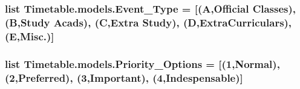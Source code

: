 \subsubsection[{\texorpdfstring{Event\+\_\+\+Type}{Event_Type}}]{\setlength{\rightskip}{0pt plus 5cm}list Timetable.\+models.\+Event\+\_\+\+Type = \mbox{[}(\textquotesingle{}A\textquotesingle{},\textquotesingle{}Official Classes\textquotesingle{}), (\textquotesingle{}B\textquotesingle{},\textquotesingle{}Study Acads\textquotesingle{}), (\textquotesingle{}C\textquotesingle{},\textquotesingle{}Extra Study\textquotesingle{}), (\textquotesingle{}D\textquotesingle{},\textquotesingle{}Extra\+Curriculars\textquotesingle{}),(\textquotesingle{}E\textquotesingle{},\textquotesingle{}Misc.\textquotesingle{})\mbox{]}}\hypertarget{namespaceTimetable_1_1models_a01707f5f0bae6a240a4d4c255d0c9306}{}\label{namespaceTimetable_1_1models_a01707f5f0bae6a240a4d4c255d0c9306}
\subsubsection[{\texorpdfstring{Priority\+\_\+\+Options}{Priority_Options}}]{\setlength{\rightskip}{0pt plus 5cm}list Timetable.\+models.\+Priority\+\_\+\+Options = \mbox{[}(\textquotesingle{}1\textquotesingle{},\textquotesingle{}Normal\textquotesingle{}),(\textquotesingle{}2\textquotesingle{},\textquotesingle{}Preferred\textquotesingle{}), (\textquotesingle{}3\textquotesingle{},\textquotesingle{}Important\textquotesingle{}), (\textquotesingle{}4\textquotesingle{},\textquotesingle{}Indespensable\textquotesingle{})\mbox{]}}\hypertarget{namespaceTimetable_1_1models_ae489395ae15eda99e8373dca59056f53}{}\label{namespaceTimetable_1_1models_ae489395ae15eda99e8373dca59056f53}
